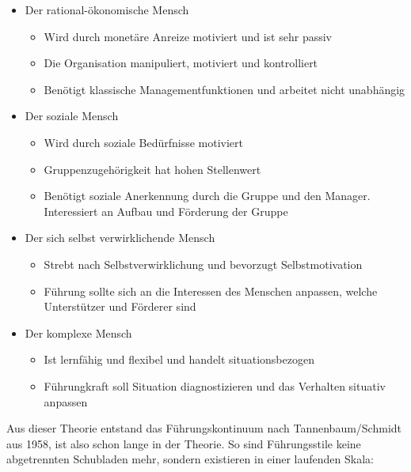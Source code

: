 \documentclass{article}
\begin{document}
	 \begin{itemize}
	 	\item{Der rational-ökonomische Mensch}
	 	\begin{itemize}
	 		\item{Wird durch monetäre Anreize motiviert und ist sehr passiv}
	 		\item{Die Organisation manipuliert, motiviert und kontrolliert}
	 		\item{Benötigt klassische Managementfunktionen und arbeitet nicht unabhängig}
	 	\end{itemize}
	 	\item{Der soziale Mensch}
	 	\begin{itemize}
	 		\item{Wird durch soziale Bedürfnisse motiviert}
	 		\item{Gruppenzugehörigkeit hat hohen Stellenwert}
	 		\item{Benötigt soziale Anerkennung durch die Gruppe und den Manager. Interessiert an Aufbau und Förderung der Gruppe}
	 	\end{itemize}
	 	\item{Der sich selbst verwirklichende Mensch}
	 	\begin{itemize}
	 		\item{Strebt nach Selbstverwirklichung und bevorzugt Selbstmotivation}
	 		\item{Führung sollte sich an die Interessen des Menschen anpassen, welche Unterstützer und Förderer sind}
	 	\end{itemize}
	 	\item{Der komplexe Mensch}
	 	\begin{itemize}
	 		\item{Ist lernfähig und flexibel und handelt situationsbezogen}
	 		\item{Führungkraft soll Situation diagnostizieren und das Verhalten situativ anpassen}
	 	\end{itemize}
	 \end{itemize}
	 Aus dieser Theorie entstand das Führungskontinuum nach Tannenbaum/Schmidt aus 1958, ist also schon lange in der Theorie. So sind Führungsstile keine abgetrennten Schubladen mehr, sondern existieren in einer laufenden Skala:
\end{document}
